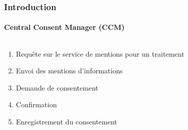 \documentclass[aspectratio=169]{beamer}
\begin{document}
\begin{frame}
    \frametitle{Introduction}
    \framesubtitle{Central Consent Manager (CCM)}
    \begin{columns}
        \begin{column}{0.45\textwidth}
            \begin{enumerate}
                \item<2-> Requête sur le service de mentions pour un traitement
                \item<3-> Envoi des mentions d'informations
                \item<4-> Demande de consentement
                \item<5-> Confirmation
                \item<6-> Enregistrement du consentement
            \end{enumerate}
        \end{column}
        \begin{column}{0.5\textwidth}
            \begin{center}

\end{center}
\end{column}
\end{columns}
\end{frame}
\end{document}
